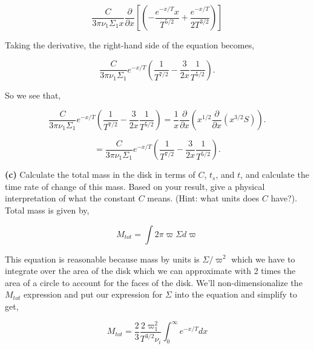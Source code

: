 \documentclass[12pt]{article}
\begin{document}
\begin{equation}
 \frac{C}{3 \pi \nu_1 \Sigma_1 x}  \frac{\partial}{\partial x} \left [\left( -\frac{e^{-x/T}x}{T^{5/2}} + \frac{e^{-x/T}}{2T^{3/2}}  \right) \right]
\end{equation}

\noindent Taking the derivative, the right-hand side of the equation becomes,

\begin{equation}
\frac{C}{3 \pi \nu_1 \Sigma_1}  e^{-x/T}\left( \frac{1}{T^{7/2}} - \frac{3}{2x}\frac{1}{T^{5/2}} \right).
\end{equation}

\noindent So we see that, 

\begin{equation}
 \frac{C}{3\pi \nu_1 \Sigma_1}e^{-x/T} \left( \frac{1}{T^{7/2}} - \frac{3}{2x}\frac{1}{T^{5/2}} \right) =  \frac{1}{x} \frac{\partial}{\partial x} \left( x^{1/2} \frac{\partial}{\partial x} \left( x^{3/2} S\right) \right).
\end{equation}

\begin{equation}
= \frac{C}{3 \pi \nu_1 \Sigma_1}  e^{-x/T}\left( \frac{1}{T^{7/2}} - \frac{3}{2x}\frac{1}{T^{5/2}} \right).
\end{equation}

\noindent \textbf{(c)} Calculate the total mass in the disk in terms of $C$, $t_s$, and $t$, and calculate the time rate of change of this mass. Based on your result, give a physical interpretation of what the constant $C$ means. (Hint: what units does $C$ have?). \\

\noindent Total mass is given by, 

\begin{equation}
M_{tot} = \int 2 \pi \varpi \Sigma d\varpi 
\end{equation}

\noindent This equation is reasonable because mass by units is $\Sigma/\varpi^2$ which we have to integrate over the area of the disk which we can approximate with 2 times the area of a circle to account for the faces of the disk. We'll non-dimensionalize the $M_{tot}$ expression and put our expression for $\Sigma$ into the equation and simplify to get,

\begin{equation}
M_{tot} = \frac{2}{3}\frac{2\varpi_1^2}{T^{3/2}\nu_i} \int_0^\infty e^{-x/T} dx 
\end{equation}
\end{document}

